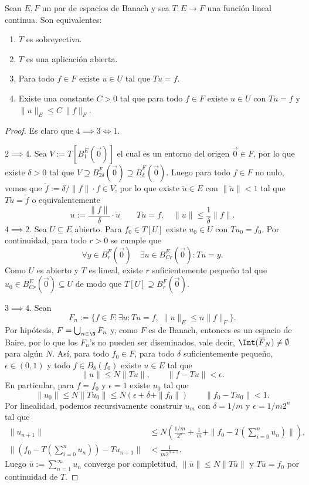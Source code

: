\documentclass[topologia-analisis.tex]{subfiles}
\begin{document}
\begin{thmi}
	Sean $E, F$ un par de espacios de Banach y sea $T \colon E \to F$ una función lineal continua.
	Son equivalentes:
	\begin{enumerate}
		\item $T$ es sobreyectiva.
		\item $T$ es una aplicación abierta.
		\item Para todo $f \in F$ existe $u \in U$ tal que $Tu = f$.
		\item Existe una constante $C > 0$ tal que para todo $f \in F$ existe $u \in U$ con $Tu = f$ y $\|u\|_E \le C\,\|f\|_F$.
	\end{enumerate}
\end{thmi}
\begin{proof}
	Es claro que $4 \implies 3 \iff 1$.

	$2 \implies 4$. Sea $V := T[B_1^E(\Vec 0)]$ el cual es un entorno del origen $\Vec 0 \in F$, por lo que existe $\delta > 0$
	tal que $V \supseteq B_{2\delta}^F(\Vec 0) \supseteq \overline{B}_\delta^F(\Vec 0)$.
	Luego para todo $f \in F$ no nulo, vemos que $\tilde f := \delta/\|f\| \cdot f \in V$, por lo que existe $\tilde u \in E$ con $\|\tilde u\| < 1$
	tal que $T\tilde u = \tilde f$ o equivalentemente
	\[
		u := \frac{\|f\|}{\delta}\cdot\tilde u \qquad Tu = f, \quad \|u\| \le \frac{1}{\delta}\|f\|.
	\]
	$4 \implies 2$. Sea $U \subseteq E$ abierto.
	Para $f_0 \in T[U]$ existe $u_0 \in U$ con $Tu_0 = f_0$.
	Por continuidad, para todo $r > 0$ se cumple que
	\[
		\forall y \in B_r^F(\Vec 0) \quad \exists u \in B_{Cr}^E(\Vec 0) : Tu = y.
	\]
	Como $U$ es abierto y $T$ es lineal, existe $r$ suficientemente pequeño tal que $u_0 \in B_{Cr}^E(\Vec 0) \subseteq U$
	de modo que $T[U] \supseteq B_r^F(\Vec 0)$.

	$3 \implies 4$. Sean
	\[
		F_n := \{ f \in F : \exists u : Tu = f, \; \|u\|_E \le n\|f\|_F \}.
	\]
	Por hipótesis, $F = \bigcup_{n\in\N} F_n$ y, como $F$ es de Banach, entonces es un espacio de Baire, por lo que los $F_n$'s no pueden
	ser diseminados, vale decir, $\Int(\overline{F}_N) \ne \emptyset$ para algún $N$.
	Así, para todo $f_0 \in F$, para todo $\delta$ suficientemente pequeño, $\epsilon \in (0, 1)$ y todo $f \in B_\delta(f_0)$
	existe $u \in E$ tal que
	\[
		\|u\| \le N\|Tu\|, \qquad \|f - Tu\| < \epsilon.
	\]
	En particular, para $f = f_0$ y $\epsilon = 1$ existe $u_0$ tal que
	\[
		\|u_0\| \le N\|Tu_0\| \le N(\epsilon + \delta + \|f_0\|) \qquad \|f_0 - Tu_0\| < 1.
	\]
	Por linealidad, podemos recursivamente construir $u_m$ con $\delta = 1/m$ y $\epsilon = 1/m2^n$ tal que
	\begin{align*}
		\|u_{n+1}\| &\le N\left( \frac{1/m}{2^n} + \frac{1}{m} + \| {\textstyle f_0 - T\left( \sum_{i=0}^{n} u_n \right)} \|\right), \\
		\|({\textstyle f_0 - T\left( \sum_{i=0}^{n} u_n \right)}) - Tu_{n+1} \| &< \frac{1}{m2^{n+1}}.
	\end{align*}
	Luego $\bar u := \sum_{n=1}^{\infty} u_n$ converge por completitud, $\|\bar u\| \le N\|T\bar u\|$ y $T\bar u = f_0$ por continuidad de $T$.
\end{proof}
\end{document}
